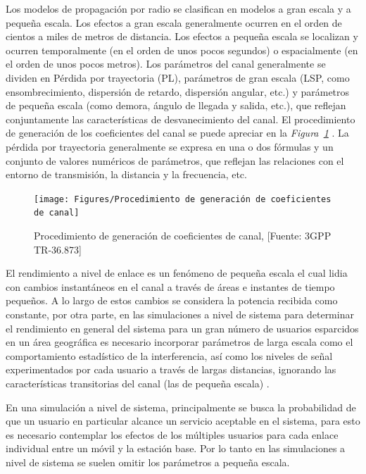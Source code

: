 Los modelos de propagación por radio se clasifican en modelos a gran escala y a pequeña escala. Los efectos a gran escala generalmente ocurren en el orden de cientos a miles de metros de distancia. Los efectos a pequeña escala se localizan y ocurren temporalmente (en el orden de unos pocos segundos) o espacialmente (en el orden de unos pocos metros). Los parámetros del canal generalmente se dividen en Pérdida por trayectoria (PL), parámetros de gran escala (LSP, como ensombrecimiento, dispersión de retardo, dispersión angular, etc.) y parámetros de pequeña escala (como demora, ángulo de llegada y salida, etc.), que reflejan conjuntamente las características de desvanecimiento del canal. El procedimiento de generación de los coeficientes del canal se puede apreciar en la \textit{Figura~\ref{fig:Procedimiento de generacion de coeficientes de canal} }. La pérdida por trayectoria generalmente se expresa en una o dos fórmulas y un conjunto de valores numéricos de parámetros, que reflejan las relaciones con el entorno de transmisión, la distancia y la frecuencia, etc. \newline

\begin{figure}[th]
\centering
\texttt{[image: Figures/Procedimiento de generación de coeficientes de canal]}
\decoRule
\caption[Procedimiento de generación de coeficientes de canal]{Procedimiento de generación de coeficientes de canal, [Fuente: 3GPP TR-36.873]}
\label{fig:Procedimiento de generacion de coeficientes de canal}
\end{figure}

El rendimiento a nivel de enlace es un fenómeno de pequeña escala el cual lidia con cambios instantáneos en el canal a través de áreas e instantes de tiempo pequeños. A lo largo de estos cambios se considera la potencia recibida como constante, por otra parte, en las simulaciones a nivel de sistema para determinar el rendimiento en general del sistema para un gran número de usuarios esparcidos en un área geográfica es necesario incorporar parámetros de larga escala como el comportamiento estadístico de la interferencia, así como los niveles de señal experimentados por cada usuario a través de largas distancias, ignorando las características transitorias del canal (las de pequeña escala) \parencite{Tranter2003}.\newline

En una simulación a nivel de sistema, principalmente se busca la probabilidad de que un usuario en particular alcance un servicio aceptable en el sistema, para esto es necesario contemplar los efectos de los múltiples usuarios para cada enlace individual entre un móvil y la estación base. Por lo tanto en las simulaciones a nivel de sistema se suelen omitir los parámetros a pequeña escala.

